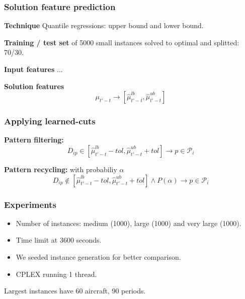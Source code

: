 \begin{frame}
\frametitle{\textbf{Solution feature prediction}}
  
  \begin{block}{\textbf{Technique}}
    Quantile regressions: upper bound and lower bound.
  \end{block}

  \begin{block}{\textbf{Training / test set}}
    of 5000 small instances solved to optimal and splitted: 70/30.
  \end{block}

  \begin{block}{\textbf{Input features}}
    ...
  \end{block}

  \begin{block}{\textbf{Solution features}}
    \begin{equation*}
      \mu_{t'-t} \to [\hat{\mu}_{t'-t}^{lb}, \hat{\mu}_{t'-t}^{ub}]
   \end{equation*}
  \end{block}

\end{frame}

\begin{frame}
\frametitle{\textbf{Applying learned-cuts}}

  \begin{block}{\textbf{Pattern filtering:}}
    \begin{equation*}
      D_{ip} \in [\hat{\mu}_{t'-t}^{lb} - tol, \hat{\mu}_{t'-t}^{ub} + tol] \rightarrow p \in \mathcal{P}_i 
    \end{equation*}
  \end{block}
  \pause

  \begin{block}{\textbf{Pattern recycling:} with probabiliy $\alpha$}
    \begin{equation*}
      D_{ip} \notin [\hat{\mu}_{t'-t}^{lb} - tol, \hat{\mu}_{t'-t}^{ub} + tol] \land P(\alpha)  \rightarrow p \in \mathcal{P}_i 
    \end{equation*}
  \end{block}
\end{frame}

\begin{frame}
\frametitle{\textbf{Experiments}}


  \begin{itemize}[<+->]

  \item Number of instances: medium (1000), large (1000) and very large
    (1000).
  \item Time limit at 3600 seconds.
  \item We seeded instance generation for better comparison.
  \item CPLEX running 1 thread.
  \end{itemize}

  Largest instances have 60 aircraft, 90 periods.
\end{frame}

